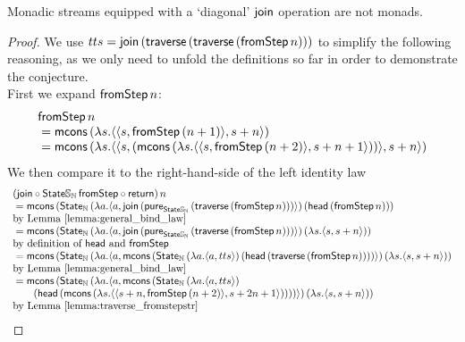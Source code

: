 \begin{conjecture}\label{lemma:monad_counterexample}
Monadic streams equipped with a `diagonal' $\mathsf{join}$ operation are not monads.
\end{conjecture}
\begin{proof}
We use $tts = \mathsf{join}\, (\mathsf{traverse}\, (\mathsf{traverse}\, (\mathsf{fromStep}\, n)))$ to simplify the following reasoning, as we only need to unfold the definitions so far in order to demonstrate the conjecture. \\

First we expand $\fromstepstr\, n$:
$$
\begin{array}{ll}
\fromstepstr\, n \\
{}= \mcons\, (\lambda s. \pair{\pair{s}{\fromstepstr\, (n + 1)}}{s + n})\\
{}= \mcons\, (\lambda s. \pair{\pair{s}{(\mcons\, (\lambda s. \pair{\pair{s}{\fromstepstr\, (n + 2)}}{s + n + 1}))}}{s + n}) \\
\end{array} 
$$
We then compare it to the right-hand-side of the left identity law
$$
\begin{array}{ll}
(\join \comp  \state\stream{\nat}\, \fromstepstr \comp \return)\, n \\
{}= \mcons\, (\state_{\nat} \,(\lambda a . \pair{a}{\join\, (\apure_{\state\stream{\nat}}\, (\mathsf{traverse}\, (\fromstepstr\, n)))})\, (\head\, (\fromstepstr\, n))) \\
 \mbox{by Lemma \ref{lemma:general_bind_law}}  \\
{}= \mcons\, (\state_{\nat}\,(\lambda a . \pair{a}{\join\, (\apure_{\state\stream{\nat}}\,(\mathsf{traverse}\, (\fromstepstr\, n)))})\, (\lambda s. \pair{s}{s + n})) \\
 \mbox{by definition of } \head \mbox{ and } \fromstepstr \\
{}= \mcons\, (\state_{\nat}\,(\lambda a . \pair{a}{  
\mcons\, (\state_{\nat} \,(\lambda a . \pair{a}{tts})\, (\head\, (\mathsf{traverse}\, (\fromstepstr\, n))))
})\, (\lambda s. \pair{s}{s + n})) \\
 \mbox{by Lemma \ref{lemma:general_bind_law}}\\
{}= \mcons\, (\state_{\nat}\,(\lambda a . \pair{a}{  
\mcons\, (\state_{\nat} \,(\lambda a . \pair{a}{tts})\, \\\qquad(\head\, (\mcons\, (\lambda s . \pair{\pair{s+n}{\fromstepstr\, (n + 2)}}{s + 2n + 1}))))
})\, (\lambda s. \pair{s}{s + n})) \\
 \mbox{by Lemma \ref{lemma:traverse_fromstepstr}}\\

\end{array}$$
\end{proof}
